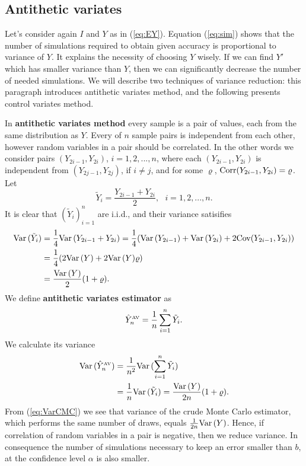 \documentclass[a4paper,12pt, oneside]{book}
\theoremstyle{definition}
\theoremstyle{remark}
\def\Var{{\rm Var}\,}
\def\Cov{{\hbox{Cov}}}
\def\Corr{{\hbox{Corr}}}
\def\AV[#1]{\hat{Y}^{\hbox{\tiny AV}}_{#1}}
\begin{document}
\subsection{Antithetic variates}
Let's consider again $I$ and $Y$ as in (\ref{eq:EY}). Equation (\ref{eq:sim}) shows that the number of simulations required to obtain given accuracy is proportional to variance of $Y$. It explains the necessity of choosing $Y$ wisely. If we can find $Y'$ which has smaller variance than $Y$, then we can significantly decrease the number of needed simulations. We will describe two techniques of variance reduction: this paragraph introduces antithetic variates method, and the following presents control variates method.

In \textbf{antithetic variates method} every sample is a pair of values, each from the same distribution as $Y$. Every of $n$ sample pairs is independent from each other, however random variables in a pair should be correlated. In the other words we consider pairs $(Y_{2i-1}, Y_{2i})$, $i=1,2,...,n$, where each $(Y_{2i-1}, Y_{2i})$ is independent from $(Y_{2j-1}, Y_{2j})$, if $i \neq j$, and for some $\varrho$, $\Corr(Y_{2i-1}, Y_{2i}) = \varrho$. Let
\begin{equation*}
 \tilde{Y}_i = \frac{Y_{2i-1} + Y_{2i}}{2},\ \ \ i = 1,2,...,n.
\end{equation*}
It is clear that $(\tilde{Y}_i)_{i=1}^n$ are i.i.d., and their variance satisifies
\begin{equation*}
 \begin{split}
 \Var(\tilde{Y}_i) &= \dfrac{1}{4} \Var( Y_{2i-1} + Y_{2i} ) = \dfrac{1}{4} (\Var(Y_{2i-1}) + \Var(Y_{2i}) + 2\Cov(Y_{2i-1}, Y_{2i})) \\
 &= \dfrac{1}{4} (2\Var(Y) + 2\Var(Y)\varrho) \\
 &= \dfrac{\Var(Y)}{2} (1 + \varrho).
 \end{split}
\end{equation*}
We define \textbf{antithetic variates estimator} as
\begin{equation*}
 \AV[n] = \frac{1}{n}\sum\limits_{i=1}^n \tilde{Y}_i.
\end{equation*}
We calculate its variance
\begin{equation}
 \label{eq:VarAV}
 \begin{split}
 \Var(\AV[n]) &= \frac{1}{n^2} \Var(\sum\limits_{i=1}^n \tilde{Y}_i) \\
   &= \frac{1}{n} \Var(\tilde{Y}_i) = \dfrac{\Var(Y)}{2n} (1 + \varrho).
 \end{split}
\end{equation}
From (\ref{eq:VarCMC}) we see that variance of the crude Monte Carlo estimator, which performs the same number of draws, equals $\frac{1}{2n}\Var(Y)$. Hence, if correlation of random variables in a pair is negative, then we reduce variance. In consequence the number of simulations necessary to keep an error smaller than $b$, at the confidence level $\alpha$ is also smaller.
\end{document}
